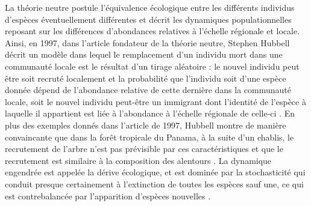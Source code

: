 La théorie neutre postule l'équivalence écologique entre les différents
individus d'espèces éventuellement différentes et décrit les dynamiques
populationnelles reposant sur les différences d'abondances relatives à
l'échelle régionale et locale. Ainsi, en 1997, dans l'article fondateur
de la théorie neutre, Stephen Hubbell décrit un modèle dans lequel le
remplacement d'un individu mort dans une communauté locale est le
résultat d'un tirage aléatoire : le nouvel individu peut être soit
recruté localement et la probabilité que l'individu soit d'une espèce
donnée dépend de l'abondance relative de cette dernière dans la
communauté locale, soit le nouvel individu peut-être un immigrant dont
l'identité de l'espèce à laquelle il appartient est liée à l'abondance à
l'échelle régionale de celle-ci \citep{Hubbell1997}. En plus des
exemples donnés dans l'article de 1997, Hubbell montre de manière
convaincante que dans la forêt tropicale du Panama, à la suite d'un
chablis, le recrutement de l'arbre n'est pas prévisible par ces
caractéristiques et que le recrutement est similaire à la composition
des alentours \citep{Hubbell1999}. La dynamique engendrée est appelée la
dérive écologique, et est dominée par la stochasticité qui conduit
presque certainement à l'extinction de toutes les espèces sauf une, ce
qui est contrebalancée par l'apparition d'espèces nouvelles
\citep{Hubbell2010, Ricklefs2003}.

